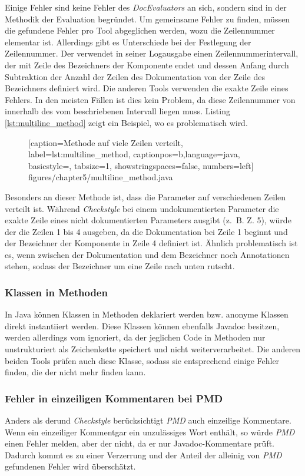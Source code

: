 Einige Fehler sind keine Fehler des \textit{DocEvaluators} an sich, sondern sind in der Methodik der Evaluation begründet. Um gemeinsame Fehler zu finden, müssen die gefundene Fehler pro Tool abgeglichen werden, wozu die Zeilennummer elementar ist. Allerdings gibt es Unterschiede bei der Festlegung der Zeilennummer. Der \doceval verwendet in seiner Logausgabe einen Zeilennummerintervall, der mit Zeile des Bezeichners der Komponente endet und dessen Anfang durch Subtraktion der Anzahl der Zeilen des Dokumentation von der Zeile des Bezeichners definiert wird. Die anderen Tools verwenden die exakte Zeile eines Fehlers. In den meisten Fällen ist dies kein Problem, da diese Zeilennummer von \checkpmd innerhalb des vom \doceval beschriebenen Intervall liegen muss. Listing \ref{lst:multiline_method} zeigt ein Beispiel, wo es problematisch wird.

		\begin{figure}[ht!]
			
			[caption={Methode auf viele Zeilen verteilt},
			label={lst:multiline_method},
			captionpos=b,language=java, basicstyle=\footnotesize, tabsize=1, showstringspaces=false,  numbers=left]
			{figures/chapter5/multiline_method.java}
		\end{figure}
Besonders an dieser Methode ist, dass die Parameter auf verschiedenen Zeilen verteilt ist. Während \textit{Checkstyle} bei einem undokumentierten Parameter die exakte Zeile eines nicht dokumentierten Parameters ausgibt (z.~B. Z. 5), würde der \doceval die Zeilen 1 bis 4 ausgeben, da die Dokumentation bei Zeile 1 beginnt und der Bezeichner der Komponente in Zeile 4 definiert ist. Ähnlich problematisch ist es, wenn zwischen der Dokumentation und dem Bezeichner noch Annotationen stehen, sodass der Bezeichner um eine Zeile nach unten rutscht.  

\subsubsection{Klassen in Methoden}

In Java können Klassen in Methoden deklariert werden bzw. anonyme Klassen direkt instantiiert werden. Diese Klassen können ebenfalls Javadoc besitzen, werden allerdings vom \doceval ignoriert, da der \doceval jeglichen Code in Methoden nur unstrukturiert als Zeichenkette speichert und nicht weiterverarbeitet. Die anderen beiden Tools prüfen auch diese Klasse, sodass sie entsprechend einige Fehler finden, die der \doceval nicht mehr finden kann. 


\subsubsection{Fehler in einzeiligen Kommentaren bei PMD}
Anders als der\doceval und \textit{Checkstyle} berücksichtigt \textit{PMD} auch einzeilige Kommentare. Wenn ein einzeiliger Kommentgar ein unzulässiges Wort enthält, so würde \textit{PMD} einen Fehler melden, aber der \doceval nicht, da er nur Javadoc-Kommentare prüft. Dadurch kommt es zu einer Verzerrung und der Anteil der alleinig von \textit{PMD} gefundenen Fehler wird überschätzt.  


